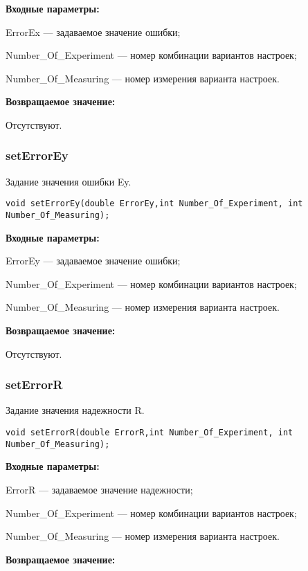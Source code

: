 \documentclass[a4paper,12pt]{article}
\begin{document}
\textbf{Входные параметры:}

ErrorEx --- задаваемое значение ошибки;
 
    Number\_Of\_Experiment --- номер комбинации вариантов настроек;
 
    Number\_Of\_Measuring --- номер измерения варианта настроек.

\textbf{Возвращаемое значение:}

Отсутствуют.


\subsubsection{setErrorEy}\label{setErrorEy}

Задание значения ошибки Ey.


\begin{lstlisting}[label=code_syntax_setErrorEy,caption=Синтаксис]
void setErrorEy(double ErrorEy,int Number_Of_Experiment, int Number_Of_Measuring);
\end{lstlisting}

\textbf{Входные параметры:}

ErrorEy --- задаваемое значение ошибки;
 
    Number\_Of\_Experiment --- номер комбинации вариантов настроек;
 
    Number\_Of\_Measuring --- номер измерения варианта настроек.

\textbf{Возвращаемое значение:}

Отсутствуют.


\subsubsection{setErrorR}\label{setErrorR}

Задание значения надежности R.


\begin{lstlisting}[label=code_syntax_setErrorR,caption=Синтаксис]
void setErrorR(double ErrorR,int Number_Of_Experiment, int Number_Of_Measuring);
\end{lstlisting}

\textbf{Входные параметры:}

ErrorR --- задаваемое значение надежности;
 
    Number\_Of\_Experiment --- номер комбинации вариантов настроек;
 
    Number\_Of\_Measuring --- номер измерения варианта настроек.

\textbf{Возвращаемое значение:}
\end{document}
